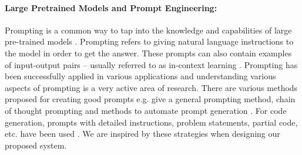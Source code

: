 

\paragraph{Large Pretrained Models and Prompt Engineering:} 
%
Prompting is a common way to tap into the knowledge and capabilities  of large pre-trained models \cite{liu2023PromptingSurvey}. Prompting refers to giving natural language instructions to the model in order to get the answer. These prompts can also contain examples of input-output pairs -- usually referred to as in-context learning \cite{brown2020language, ICL2023Survey}. Prompting has been successfully applied in various applications and understanding various aspects of prompting is a very active area of research. 
There are various methods proposed for creating good prompts e.g. 
\cite{arora2023ask} give a general prompting method, chain of thought  prompting \cite{wei2022chain-of-thought} and methods to automate prompt generation \cite{zhou2022-auto-prompt}. For code generation, prompts with detailed instructions, problem statements, partial code, etc. have been used \cite{sami2022-prompting-code, paul2022prompting-code}. We are inspired by these strategies when designing our proposed system. 


